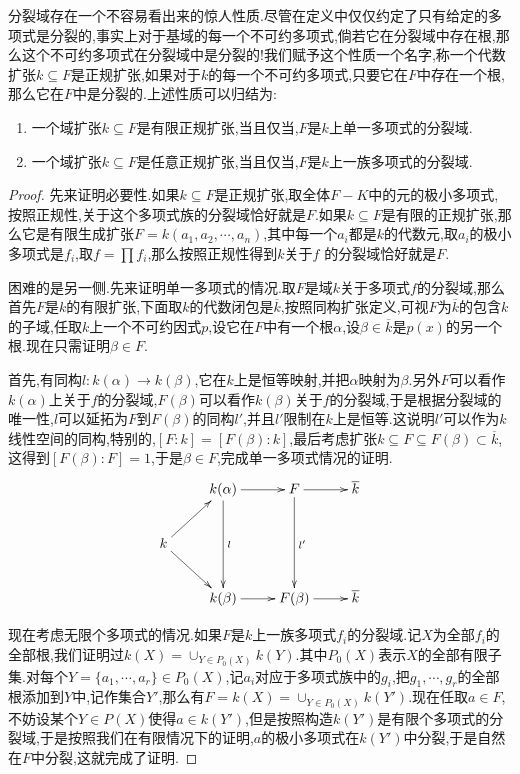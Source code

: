 分裂域存在一个不容易看出来的惊人性质.尽管在定义中仅仅约定了只有给定的多项式是分裂的,事实上对于基域的每一个不可约多项式,倘若它在分裂域中存在根,那么这个不可约多项式在分裂域中是分裂的!我们赋予这个性质一个名字,称一个代数扩张$k\subseteq F$是正规扩张,如果对于$k$的每一个不可约多项式,只要它在$F$中存在一个根,那么它在$F$中是分裂的.上述性质可以归结为:
\begin{enumerate}
	\item 一个域扩张$k\subseteq F$是有限正规扩张,当且仅当,$F$是$k$上单一多项式的分裂域.
	\item 一个域扩张$k\subseteq F$是任意正规扩张,当且仅当,$F$是$k$上一族多项式的分裂域.
\end{enumerate}
\begin{proof}

先来证明必要性.如果$k\subseteq F$是正规扩张,取全体$F-K$中的元的极小多项式,按照正规性,关于这个多项式族的分裂域恰好就是$F$.如果$k\subseteq F$是有限的正规扩张,那么它是有限生成扩张$F=k(a_1,a_2,\cdots,a_n)$,其中每一个$a_i$都是$k$的代数元,取$a_i$的极小多项式是$f_i$,取$f=\prod f_i$,那么按照正规性得到$k$关于$f$ 的分裂域恰好就是$F$.

困难的是另一侧.先来证明单一多项式的情况.取$F$是域$k$关于多项式$f$的分裂域,那么首先$F$是$k$的有限扩张,下面取$k$的代数闭包是$\overline{k}$,按照同构扩张定义,可视$F$为$\overline{k}$的包含$k$的子域,任取$k$上一个不可约因式$p$,设它在$F$中有一个根$\alpha$,设$\beta\in\overline{k}$是$p(x)$的另一个根.现在只需证明$\beta\in F$.

首先,有同构$l:k(\alpha)\to k(\beta)$,它在$k$上是恒等映射,并把$\alpha$映射为$\beta$.另外$F$可以看作$k(\alpha)$上关于$f$的分裂域,$F(\beta)$可以看作$k(\beta)$关于$f$的分裂域,于是根据分裂域的唯一性,$l$可以延拓为$F$到$F(\beta)$的同构$l'$,并且$l'$限制在$k$上是恒等.这说明$l'$可以作为$k$线性空间的同构,特别的,$[F:k]=[F(\beta):k]$,最后考虑扩张$k\subseteq F\subseteq F(\beta)\subset\overline{k}$,这得到$[F(\beta):F]=1$,于是$\beta\in F$,完成单一多项式情况的证明.
$$\xymatrix{
	&k(\alpha)\ar[r]\ar[dd]^l&F\ar[r]\ar[dd]^{l'}&\overline{k}\\
	k\ar[ur]\ar[dr]&&&\\
	&k(\beta)\ar[r]&F(\beta)\ar[r]&\overline{k}
}$$

现在考虑无限个多项式的情况.如果$F$是$k$上一族多项式$f_i$的分裂域.记$X$为全部$f_i$的全部根,我们证明过$k(X)=\cup_{Y\in P_0(X)}k(Y)$.其中$P_0(X)$表示$X$的全部有限子集.对每个$Y=\{a_1,\cdots,a_r\}\in P_0(X)$,记$a_i$对应于多项式族中的$g_i$,把$g_1,\cdots,g_r$的全部根添加到$Y$中,记作集合$Y'$,那么有$F=k(X)=\cup_ {Y\in P_0(X)}k(Y')$.现在任取$a\in F$,不妨设某个$Y\in P(X)$使得$a\in k(Y')$,但是按照构造$k(Y')$是有限个多项式的分裂域,于是按照我们在有限情况下的证明,$a$的极小多项式在$k(Y')$中分裂,于是自然在$F$中分裂,这就完成了证明.
\end{proof}

